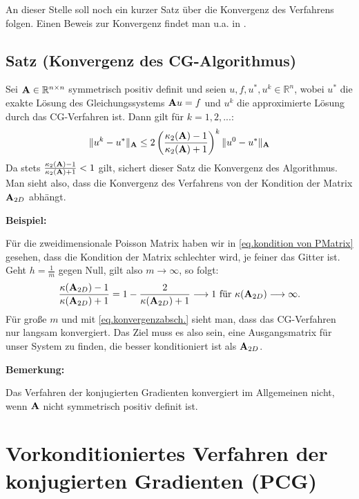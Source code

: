 An dieser Stelle soll noch ein kurzer Satz über die Konvergenz des Verfahrens folgen. Einen Beweis zur Konvergenz findet man u.a. in \cite{GL96}.

\subsection{Satz (Konvergenz des CG-Algorithmus)}\label{ss.Konvergenz CG}

Sei ${\textbf{A}} \in \mathbb{R}^{n \times n}$ symmetrisch positiv definit und seien $u,f,u^{*},u^{k} \in \mathbb{R}^{n}$, wobei $u^{*}$ die exakte Lösung des Gleichungssystems ${\textbf{A}}u = f$ und $u^{k}$ die approximierte Lösung durch das CG-Verfahren ist. Dann gilt für $k = 1,2,...$:
\begin{equation}
\| u^{k} - u^{*} \|_{{\textbf{A}}} \le 2 \left( \frac {\kappa_{2} ({\textbf{A}}) - 1} {\kappa_{2} ({\textbf{A}}) + 1} \right)^{k} \| u^{0} - u^{*} \|_{{\textbf{A}}} \label{eq.konvergenzabsch.}
\end{equation}
Da stets $\frac {\kappa_{2} ({\textbf{A}}) - 1} {\kappa_{2} ({\textbf{A}}) + 1} < 1$ gilt, sichert dieser Satz die Konvergenz des Algorithmus. Man sieht also, dass die Konvergenz des Verfahrens von der Kondition der Matrix ${\textbf{A}}_{2D}$ abhängt.

\textbf{Beispiel:}

Für die zweidimensionale Poisson Matrix haben wir in \autoref{eq.kondition von PMatrix} gesehen, dass die Kondition der Matrix schlechter wird, je feiner das Gitter ist. Geht $h = \frac{1}{m}$ gegen Null, gilt also $m \longrightarrow \infty$, so folgt:
\begin{equation}
  \frac {\kappa({\textbf{A}}_{2D}) - 1} {\kappa({\textbf{A}}_{2D}) + 1} = 1 - \frac {2} {\kappa({\textbf{A}}_{2D}) + 1} \longrightarrow 1 \textnormal{ für } \kappa({\textbf{A}}_{2D}) \longrightarrow \infty.
\end{equation}
Für große $m$ und mit \autoref{eq.konvergenzabsch.} sieht man, dass das CG-Verfahren nur langsam konvergiert. Das Ziel muss es also sein, eine Ausgangsmatrix für unser System zu finden, die besser konditioniert ist als ${\textbf{A}}_{2D}$. 

\textbf{Bemerkung:}

Das Verfahren der konjugierten Gradienten konvergiert im Allgemeinen nicht, wenn ${\textbf{A}}$ nicht symmetrisch positiv definit ist.

\section{Vorkonditioniertes Verfahren der konjugierten Gradienten (PCG)}\label{s.PCG}

